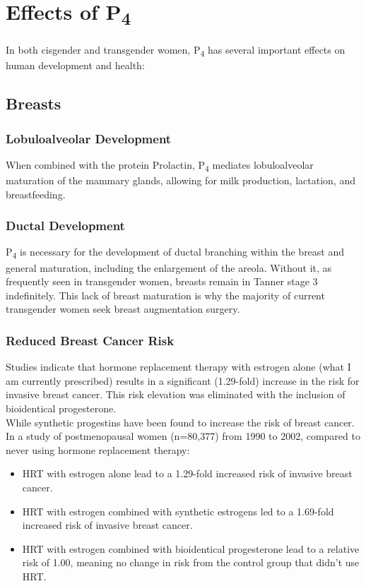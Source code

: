 \documentclass[
	secnumdepth=3, %
]{kaohandt}
\newcommand\tsub[1]{\textsubscript{#1}}
\begin{document}
\section{Effects of P\tsub{4}}
In both cisgender and transgender women, P\tsub{4} has several important effects on human development and health:
\subsection{Breasts}

\subsubsection{Lobuloalveolar Development}
When combined with the protein Prolactin, P\tsub{4} mediates lobuloalveolar maturation of the mammary glands, allowing for milk production, lactation, and breastfeeding.

\subsubsection{Ductal Development}
P\tsub{4} is necessary for the development of ductal branching within the breast and general maturation, including the enlargement of the areola. Without it, as frequently seen in transgender women, breasts remain in Tanner stage 3 indefinitely. This lack of breast maturation is why the majority of current transgender women seek breast augmentation surgery.

\subsubsection{Reduced Breast Cancer Risk}
Studies indicate that hormone replacement therapy with estrogen alone (what I am currently prescribed) results in a significant (1.29-fold) increase in the risk for invasive breast cancer. This risk elevation was eliminated with the inclusion of bioidentical progesterone.\\

\noindent While synthetic progestins have been found to increase the risk of breast cancer. In a study of postmenopausal women (n=80,377) from 1990 to 2002, compared to never using hormone replacement therapy:
\begin{itemize}
    \item HRT with estrogen alone lead to a 1.29-fold increased risk of invasive breast cancer.
    \item HRT with estrogen combined with synthetic estrogens led to a 1.69-fold increased risk of invasive breast cancer.
    \item HRT with estrogen combined with bioidentical progesterone lead to a relative risk of 1.00, meaning no change in risk from the control group that didn't use HRT.
\end{itemize}
\end{document}

